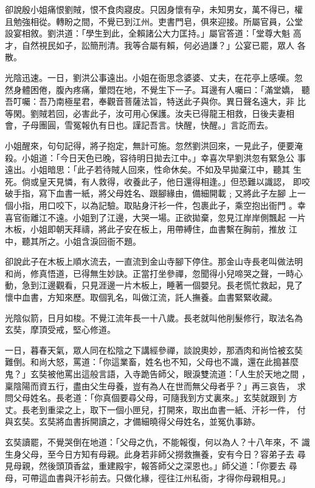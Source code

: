 \begin{pinyinscope}
{卻說殷小姐痛恨劉賊，恨不食肉寢皮。只因身懷有孕，未知男女，萬不得已，權
且勉強相從。轉盼之間，不覺已到江州。吏書門皂，俱來迎接。所屬官員，公堂
設宴相敘。劉洪道：「學生到此，全賴諸公大力匡持。」屬官答道：「堂尊大魁
高才，自然視民如子，訟簡刑清。我等合屬有賴，何必過謙？」公宴已罷，眾人
各散。

光陰迅速。一日，劉洪公事遠出。小姐在衙思念婆婆、丈夫，在花亭上感嘆。忽
然身體困倦，腹內疼痛，暈悶在地，不覺生下一子。耳邊有人囑曰：「滿堂嬌，
聽吾叮囑：吾乃南極星君，奉觀音菩薩法旨，特送此子與你。異日聲名遠大，非
比等閑。劉賊若回，必害此子，汝可用心保護。汝夫已得龍王相救，日後夫妻相
會，子母團圓，雪冤報仇有日也。謹記吾言。快醒，快醒。」言訖而去。

小姐醒來，句句記得，將子抱定，無計可施。忽然劉洪回來，一見此子，便要淹
殺。小姐道：「今日天色已晚，容待明日拋去江中。」幸喜次早劉洪忽有緊急公
事遠出。小姐暗思：「此子若待賊人回來，性命休矣。不如及早拋棄江中，聽其
生死。倘或皇天見憐，有人救得，收養此子，他日還得相逢。」但恐難以識認，
即咬破手指，寫下血書一紙，將父母姓名、跟腳緣由，備細開載﹔又將此子左腳
上一個小指，用口咬下，以為記驗。取貼身汗衫一件，包裹此子，乘空抱出衙門
。幸喜官衙離江不遠。小姐到了江邊，大哭一場。正欲拋棄，忽見江岸岸側飄起
一片木板，小姐即朝天拜禱，將此子安在板上，用帶縛住，血書繫在胸前，推放
江中，聽其所之。小姐含淚回衙不題。

卻說此子在木板上順水流去，一直流到金山寺腳下停住。那金山寺長老叫做法明
和尚，修真悟道，已得無生妙訣。正當打坐參禪，忽聞得小兒啼哭之聲，一時心
動，急到江邊觀看，只見涯邊一片木板上，睡著一個嬰兒。長老慌忙救起，見了
懷中血書，方知來歷。取個乳名，叫做江流，託人撫養。血書緊緊收藏。

光陰似箭，日月如梭。不覺江流年長一十八歲。長老就叫他削髮修行，取法名為
玄奘，摩頂受戒，堅心修道。

一日，暮春天氣，眾人同在松陰之下講經參禪，談說奧妙，那酒肉和尚恰被玄奘
難倒。和尚大怒，罵道：「你這業畜，姓名也不知，父母也不識，還在此搗甚麼
鬼？」玄奘被他罵出這般言語，入寺跪告師父，眼淚雙流道：「人生於天地之間
，稟陰陽而資五行，盡由父生母養，豈有為人在世而無父母者乎？」再三哀告，
求問父母姓名。長老道：「你真個要尋父母，可隨我到方丈裏來。」玄奘就跟到
方丈。長老到重梁之上，取下一個小匣兒，打開來，取出血書一紙、汗衫一件，
付與玄奘。玄奘將血書拆開讀之，才備細曉得父母姓名，並冤仇事跡。

玄奘讀罷，不覺哭倒在地道：「父母之仇，不能報復，何以為人？十八年來，不
識生身父母，至今日方知有母親。此身若非師父撈救撫養，安有今日？容弟子去
尋見母親，然後頭頂香盆，重建殿宇，報答師父之深恩也。」師父道：「你要去
尋母，可帶這血書與汗衫前去。只做化緣，徑往江州私衙，才得你母親相見。」

}
\end{pinyinscope}
